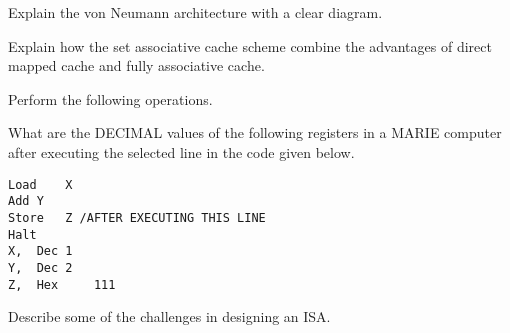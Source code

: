 \documentclass[12pt]{exam}
\begin{document}
\newpage
\begin{questions}

\question[20] Explain the von Neumann architecture with a clear diagram.
\addpoints

\question[20] Explain how the set associative cache scheme combine the advantages of direct mapped cache and fully associative cache.
\addpoints

\question [20] Perform the following operations.
\noaddpoints %
\addpoints


\question [20] What are the DECIMAL values of the following registers in a MARIE computer after executing the selected line in the code given below.
\noaddpoints %
\begin{lstlisting}
Load	X 
Add	Y 
Store 	Z /AFTER EXECUTING THIS LINE 
Halt
X,	Dec	1
Y,	Dec	2
Z,	Hex 	111
\end{lstlisting}
\addpoints

\question [20] Describe some of the challenges in designing an ISA.
\end{questions}
\end{document}
